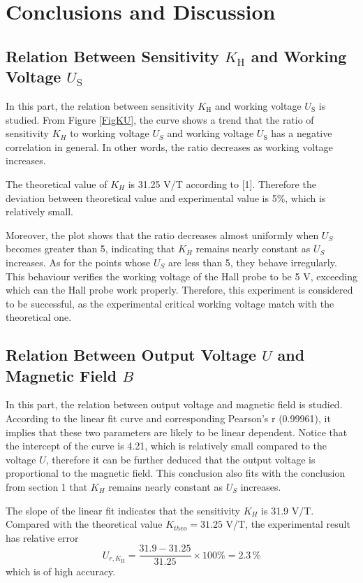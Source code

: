 \documentclass{article}
\begin{document}
		\section{Conclusions and Discussion}
		
	\subsection{Relation Between Sensitivity $K_\text{H}$ and Working Voltage $U_\text{S}$}

In this part, the relation between sensitivity $K_\text{H}$ and working voltage $U_\text{S}$ is studied. From Figure \ref{FigKU}, the curve shows a trend that the ratio of sensitivity $K_H$ to working voltage $U_S$ and working voltage $U_\text{S}$ has a negative correlation in general. In other words, the ratio decreases as working voltage increases.

The theoretical value of $K_H$ is 31.25 V/T according to [1]. Therefore the deviation between theoretical value and experimental value is 5\%, which is relatively small.

Moreover, the plot shows that the ratio decreases almost uniformly when $U_S$ becomes greater than 5, indicating that $K_H$ remains nearly constant as $U_S$ increases. As for the points whose $U_S$ are less than 5, they behave irregularly. This behaviour verifies the working voltage of the Hall probe to be 5 V, exceeding which can the Hall probe work properly. Therefore, this experiment is considered to be successful, as the experimental critical  working voltage match with the theoretical one.
	
	\subsection{Relation Between Output Voltage $U$ and Magnetic Field $B$}
	
In this part, the relation between output voltage and magnetic field is studied. According to the linear fit curve and corresponding Pearson's r (0.99961), it implies that these two parameters are likely to be linear dependent. Notice that the intercept of the curve is 4.21, which is relatively small compared to the voltage $U$, therefore it can be further deduced that the output voltage is proportional to the magnetic field. This conclusion also fits with the conclusion from section 1 that  $K_H$ remains nearly constant as $U_S$ increases.

The slope of the linear fit indicates that the sensitivity $K_H$ is  31.9 V/T. Compared with the theoretical value $K_{theo}=31.25$ V/T, the experimental result has relative error
$$
U_{r,K_\text{H}} = \frac{31.9-31.25}{31.25}\times 100\% = 2.3\,\%
$$ 
which is of high accuracy.
\end{document}
